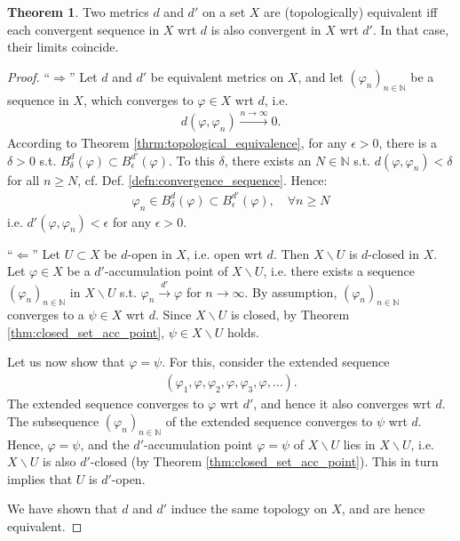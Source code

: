 \documentclass[12pt, a4paper]{article}
\numberwithin{equation}{section}
\theoremstyle{definition}
\theoremstyle{definition}
\newtheorem{theorem}[thm]{Theorem}
\begin{document}
		\begin{theorem}
			Two metrics $d$ and $d'$ on a set $X$ are (topologically) equivalent iff each convergent sequence in $X$ wrt $d$ is also convergent in $X$ wrt $d'$. In that case, their limits coincide.
		\end{theorem}
		
		\begin{proof}
			\enquote{$\Longrightarrow$} Let $d$ and $d'$ be equivalent metrics on $X$, and let $(\varphi_n)_{n\in\mathbb N}$ be a sequence in $X$, which converges to $\varphi\in X$ wrt $d$, i.e.
			\begin{align}
				d(\varphi, \varphi_n) \overset{n\to\infty}{\longrightarrow} 0.
			\end{align}
			According to Theorem \ref{thrm:topological_equivalence}, for any $\epsilon > 0$, there is a $\delta > 0$ s.t. $B_{\delta}^{d}(\varphi) \subset B_{\epsilon}^{d'}(\varphi)$. To this $\delta$, there exists an $N\in\mathbb N$ s.t. $d(\varphi, \varphi_n) < \delta$ for all $n\geq N$, cf. Def. \ref{defn:convergence_sequence}. Hence:
			\begin{align}
				\varphi_n\in B^{d}_{\delta}(\varphi) \subset B^{d'}_{\epsilon}(\varphi), \quad \forall n\geq N
			\end{align}
			i.e. $d'(\varphi, \varphi_n) < \epsilon$ for any $\epsilon > 0$.
			
			\enquote{$\Longleftarrow$} Let $U\subset X$ be $d$-open in $X$, i.e. open wrt $d$. Then $X\backslash U$ is $d$-closed in $X$. Let $\varphi\in X$ be a $d'$-accumulation point of $X\backslash U$, i.e. there exists a sequence $(\varphi_n)_{n\in\mathbb N}$ in $X\backslash U$ s.t. $\varphi_n \overset{d'}{\longrightarrow} \varphi$ for $n\to\infty$. By assumption, $(\varphi_n)_{n\in\mathbb N}$ converges to a $\psi\in X$ wrt $d$. Since $X\backslash U$ is closed, by Theorem \ref{thm:closed_set_acc_point}, $\psi\in X\backslash U$ holds. 
			
			Let us now show that $\varphi = \psi$. For this, consider the extended sequence 
			\begin{align}
				\left(\varphi_1, \varphi, \varphi_2, \varphi, \varphi_3, \varphi, \dots\right).
			\end{align}
			The extended sequence converges to $\varphi$ wrt $d'$, and hence it also converges wrt $d$. The subsequence $(\varphi_n)_{n\in\mathbb N}$ of the extended sequence converges to $\psi$ wrt $d$. Hence, $\varphi = \psi$, and the $d'$-accumulation point $\varphi=\psi$ of $X\backslash U$ lies in $X\backslash U$, i.e. $X\backslash U$ is also $d'$-closed (by Theorem \ref{thm:closed_set_acc_point}). This in turn implies that $U$ is $d'$-open.
			
			We have shown that $d$ and $d'$ induce the same topology on $X$, and are hence equivalent.
		\end{proof}
				
\end{document}
